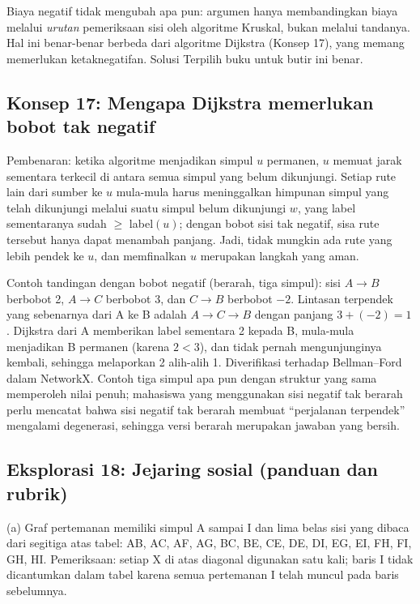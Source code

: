 Biaya negatif tidak mengubah apa pun: argumen hanya membandingkan biaya melalui \emph{urutan} pemeriksaan sisi oleh algoritme Kruskal, bukan melalui tandanya. Hal ini benar-benar berbeda dari algoritme Dijkstra (Konsep 17), yang memang memerlukan ketaknegatifan. Solusi Terpilih buku untuk butir ini benar.

\subsection*{Konsep 17: Mengapa Dijkstra memerlukan bobot tak negatif}

Pembenaran: ketika algoritme menjadikan simpul $u$ permanen, $u$ memuat jarak sementara terkecil di antara semua simpul yang belum dikunjungi. Setiap rute lain dari sumber ke $u$ mula-mula harus meninggalkan himpunan simpul yang telah dikunjungi melalui suatu simpul belum dikunjungi $w$, yang label sementaranya sudah $\geq$ label$(u)$; dengan bobot sisi tak negatif, sisa rute tersebut hanya dapat menambah panjang. Jadi, tidak mungkin ada rute yang lebih pendek ke $u$, dan memfinalkan $u$ merupakan langkah yang aman.

Contoh tandingan dengan bobot negatif (berarah, tiga simpul): sisi $A \to B$ berbobot 2, $A \to C$ berbobot 3, dan $C \to B$ berbobot $-2$. Lintasan terpendek yang sebenarnya dari A ke B adalah $A \to C \to B$ dengan panjang $3 + (-2) = 1$. Dijkstra dari A memberikan label sementara 2 kepada B, mula-mula menjadikan B permanen (karena $2 < 3$), dan tidak pernah mengunjunginya kembali, sehingga melaporkan 2 alih-alih 1. Diverifikasi terhadap Bellman--Ford dalam NetworkX. Contoh tiga simpul apa pun dengan struktur yang sama memperoleh nilai penuh; mahasiswa yang menggunakan sisi negatif tak berarah perlu mencatat bahwa sisi negatif tak berarah membuat “perjalanan terpendek” mengalami degenerasi, sehingga versi berarah merupakan jawaban yang bersih.

\subsection*{Eksplorasi 18: Jejaring sosial (panduan dan rubrik)}

(a) Graf pertemanan memiliki simpul A sampai I dan lima belas sisi yang dibaca dari segitiga atas tabel: AB, AC, AF, AG, BC, BE, CE, DE, DI, EG, EI, FH, FI, GH, HI. Pemeriksaan: setiap X di atas diagonal digunakan satu kali; baris I tidak dicantumkan dalam tabel karena semua pertemanan I telah muncul pada baris sebelumnya.


